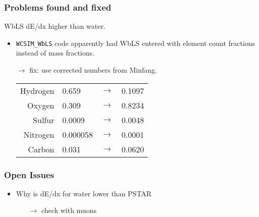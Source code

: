 \documentclass[]{beamer}
\begin{document}
\begin{frame}[fragile]
  \frametitle{Problems found and fixed}
  
  WbLS dE/dx higher than water.
  \begin{itemize}
  \item \texttt{WCSIM\_WbLS} code apparently had WbLS entered with
    element count fractions instead of mass fractions.
  \item[$\rightarrow$] fix: use corrected numbers from Minfang.
    \begin{center}\footnotesize
    \begin{tabular}[h]{rlcl}
Hydrogen & 0.659    & $\rightarrow$ & 0.1097 \\
Oxygen   & 0.309    & $\rightarrow$ & 0.8234 \\
Sulfur   & 0.0009   & $\rightarrow$ & 0.0048 \\
Nitrogen & 0.000058 & $\rightarrow$ & 0.0001 \\
Carbon   & 0.031    & $\rightarrow$ & 0.0620 \\
    \end{tabular}
    \end{center}
  \end{itemize}
\end{frame}

\begin{frame}[fragile]
  \frametitle{Open Issues}

    \begin{itemize}
    \item Why is dE/dx for water lower than PSTAR
      \begin{itemize}
      \item[$\rightarrow$] check with muons
      \end{itemize}
    \end{itemize}
  
\end{frame}
\end{document}
